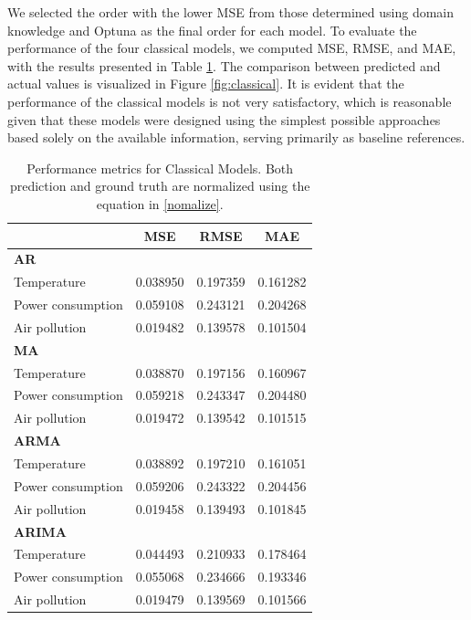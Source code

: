 \documentclass{scrartcl}
\begin{document}
We selected the order with the lower MSE from those determined using domain knowledge and Optuna as the final order for each model. To evaluate the performance of the four classical models, we computed MSE, RMSE, and MAE, with the results presented in Table \ref{tab:classical_metric}. The comparison between predicted and actual values is visualized in Figure \ref{fig:classical}. It is evident that the performance of the classical models is not very satisfactory, which is reasonable given that these models were designed using the simplest possible approaches based solely on the available information, serving primarily as baseline references.
\begin{table}[h!]
\centering
\begin{tabular}{@{}lccc@{}}
\toprule
\textbf{}               & \textbf{MSE} & \textbf{RMSE} & \textbf{MAE} \\ \midrule
\textbf{AR}             &              &               &              \\
Temperature             & 0.038950     & 0.197359      & 0.161282     \\
Power consumption       & 0.059108     & 0.243121      & 0.204268     \\
Air pollution           & 0.019482     & 0.139578      & 0.101504     \\ \midrule
\textbf{MA}             &              &               &              \\
Temperature             & 0.038870     & 0.197156      & 0.160967    \\
Power consumption       & 0.059218     & 0.243347      & 0.204480     \\
Air pollution           & 0.019472     & 0.139542      & 0.101515     \\ \midrule
\textbf{ARMA}           &              &               &              \\
Temperature             & 0.038892     & 0.197210      & 0.161051     \\
Power consumption       & 0.059206     & 0.243322      & 0.204456     \\
Air pollution           & 0.019458     & 0.139493      & 0.101845      \\ \midrule
\textbf{ARIMA}          &              &               &              \\
Temperature             & 0.044493     & 0.210933      & 0.178464     \\
Power consumption       & 0.055068     & 0.234666      & 0.193346     \\
Air pollution           & 0.019479     & 0.139569      & 0.101566       \\ \bottomrule
\end{tabular}
\caption{Performance metrics for Classical Models. Both prediction and ground truth are normalized using the equation in \ref{nomalize}.}
\label{tab:classical_metric}
\end{table}
\end{document}
